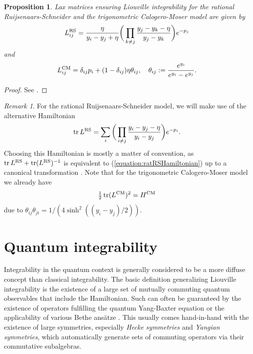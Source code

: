 \documentclass[11pt]{report}
\newtheorem{prop}[theorem]{Proposition}
\theoremstyle{definition}
\theoremstyle{remark}
\newtheorem*{remark}{Remark}
\theoremstyle{remark}
\begin{document}
\begin{prop}
Lax matrices ensuring Liouville integrability for the rational Ruijsenaars-Schneider and the trigonometric Calogero-Moser model are given by
\begin{equation}\label{equation:RSLaxMatrix}
L_{ij}^\textnormal{RS} = \frac{\eta}{y_i-y_j+\eta} \bigg( \prod_{k \neq j} \frac{y_j-y_k-\eta}{y_j-y_k} \bigg) e^{-p_j}
\end{equation}
and
\begin{equation*}
L_{ij}^\textnormal{CM} = \delta_{ij} p_i + (1-\delta_{ij}) \eta \theta_{ij}, \quad \theta_{ij} := \frac{e^{y_i}}{e^{y_i}-e^{y_j}}.
\end{equation*}
\end{prop}

\begin{proof}
See \cite{book:arutyunov:elements}.
\end{proof}

\begin{remark}
For the rational Ruijsenaars-Schneider model, we will make use of the alternative Hamiltonian
\begin{equation}\label{equation:ratRSHamiltonianPrime}
\operatorname{tr} L^\textnormal{RS} = \sum_i \bigg( \prod_{i \neq j} \frac{y_i-y_j-\eta}{y_i-y_j} \bigg) e^{-p_i}.
\end{equation}
Choosing this Hamiltonian is mostly a matter of convention, as $\operatorname{tr} L^\textnormal{RS} + \operatorname{tr}(L^\textnormal{RS})^{-1}$ is equivalent to (\ref{equation:ratRSHamiltonian}) up to a canonical transformation \cite{book:arutyunov:elements}. Note that for the trigonometric Calogero-Moser model we already have
\begin{equation*}
\tfrac{1}{2} \operatorname{tr} (L^\textnormal{CM})^2 = H^\textnormal{CM}
\end{equation*}
due to $\theta_{ij} \theta_{ji} = 1/(4 \sinh^2((y_i-y_j)/2))$.
\end{remark}

\section{Quantum integrability}

Integrability in the quantum context is generally considered to be a more diffuse concept than classical integrability. The basic definition generalizing Liouville integrability is the existence of a large set of mutually commuting quantum observables that include the Hamiltonian. Such can often be guaranteed by the existence of operators fulfilling the quantum Yang-Baxter equation or the applicability of various Bethe ansätze \cite{book:arutyunov:betheAnsatz}. This usually comes hand-in-hand with the existence of large symmetries, especially \emph{Hecke symmetries} and \emph{Yangian symmetries}, which automatically generate sets of commuting operators via their commutative subalgebras.
\end{document}
